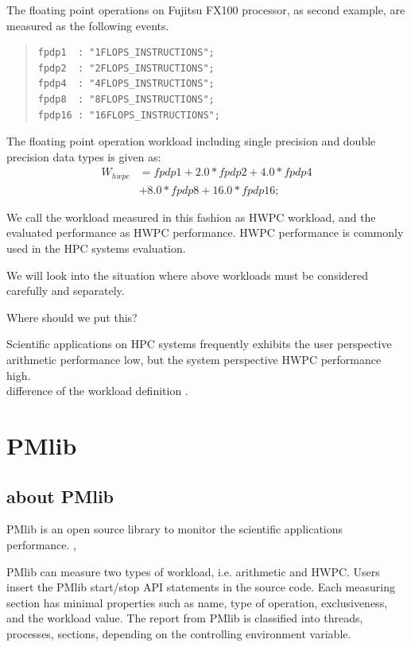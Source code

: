 \documentclass[conference]{IEEEtran}
\begin{document}
The floating point operations on Fujitsu FX100 processor, as second example,
are measured as the following events.
\begin{quote}
\begin{small}
\begin{verbatim}
fpdp1  : "1FLOPS_INSTRUCTIONS";
fpdp2  : "2FLOPS_INSTRUCTIONS";
fpdp4  : "4FLOPS_INSTRUCTIONS";
fpdp8  : "8FLOPS_INSTRUCTIONS";
fpdp16 : "16FLOPS_INSTRUCTIONS";
\end{verbatim}
\end{small}
\end{quote}
The floating point operation workload including single precision
and double precision data types is given as:
\begin{align}
	W_{hwpc} & = fpdp1 + 2.0*fpdp2 + 4.0*fpdp4 \nonumber \\
			& + 8.0*fpdp8 + 16.0*fpdp16; 
\end{align}

We call the workload measured in this fashion as HWPC workload,
and the evaluated performance as HWPC performance.
HWPC performance is commonly used in the HPC systems evaluation.

We will look into the situation where above workloads must be considered
carefully and separately.

{\color{blue} Where should we put this?}\par
Scientific applications on HPC systems frequently exhibits
the user perspective arithmetic performance low,
but the system perspective HWPC performance high. \\
difference of the workload definition . \\


\section{PMlib}

\subsection {about PMlib}

PMlib is an open source library to monitor the scientific applications
performance. 
\cite{PMlib:webpage-public},

PMlib can measure two types of workload, i.e. arithmetic and HWPC.
Users insert the PMlib start/stop API statements in the source code.
Each measuring section has minimal properties such as name, type of operation,
exclusiveness, and the workload value.
The report from PMlib is classified into threads, processes, sections,
depending on the controlling environment variable.
\end{document}
